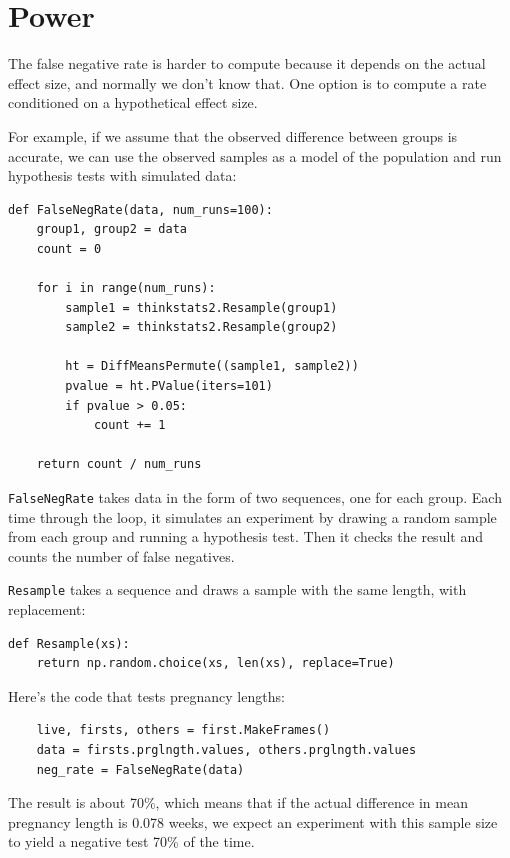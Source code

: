 \documentclass[12pt]{book}
\theoremstyle{exercise}
\begin{document}
\section{Power}%
\label{power}

The false negative rate is harder to compute because it depends on
the actual effect size, and normally we don't know that.
One option is to compute a rate
conditioned on a hypothetical effect size.%

For example, if we assume that the observed difference between groups
is accurate, we can use the observed samples as a model of the
population and run hypothesis tests with simulated data:%

\begin{verbatim}
def FalseNegRate(data, num_runs=100):
    group1, group2 = data
    count = 0

    for i in range(num_runs):
        sample1 = thinkstats2.Resample(group1)
        sample2 = thinkstats2.Resample(group2)

        ht = DiffMeansPermute((sample1, sample2))
        pvalue = ht.PValue(iters=101)
        if pvalue > 0.05:
            count += 1

    return count / num_runs
\end{verbatim}

{\tt FalseNegRate} takes data in the form of two sequences, one for
each group.  Each time through the loop, it simulates an experiment by
drawing a random sample from each group and running a hypothesis test.
Then it checks the result and counts the number of false negatives.%
%

{\tt Resample} takes a sequence and draws a sample with the same
length, with replacement:%

\begin{verbatim}
def Resample(xs):
    return np.random.choice(xs, len(xs), replace=True)
\end{verbatim}

Here's the code that tests pregnancy lengths:

\begin{verbatim}
    live, firsts, others = first.MakeFrames()
    data = firsts.prglngth.values, others.prglngth.values
    neg_rate = FalseNegRate(data)
\end{verbatim}

The result is about 70\%, which means that if the actual difference in
mean pregnancy length is 0.078 weeks, we expect an experiment with this
sample size to yield a negative test 70\% of the time.%
\end{document}
